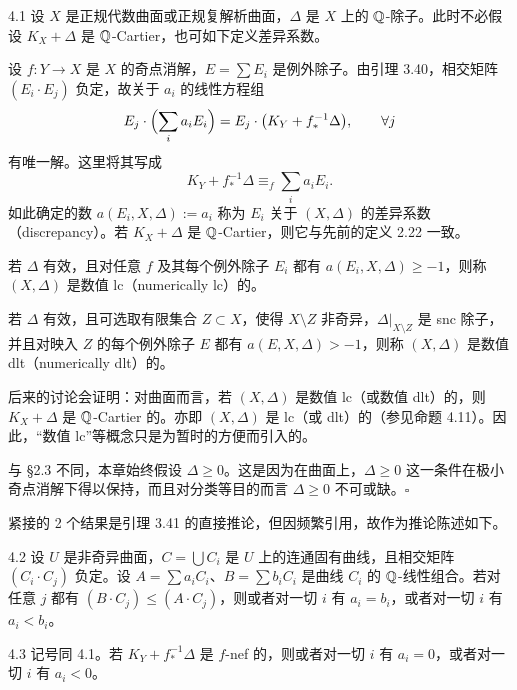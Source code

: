 \begin{notation}{4.1}
设 $X$ 是正规代数曲面或正规复解析曲面，$\Delta$ 是 $X$ 上的 $\mathbb{Q}$-除子。此时不必假设 $K_X+\Delta$ 是 $\mathbb{Q}$-Cartier，也可如下定义差异系数。

设 $f\colon Y\to X$ 是 $X$ 的奇点消解，$E=\sum E_i$ 是例外除子。由引理 3.40，相交矩阵 $(E_i\cdot E_j)$ 负定，故关于 $a_i$ 的线性方程组
\[
E_j\cdot\Bigl(\sum_i a_iE_i\Bigr)=E_j\cdot\bigl(K_Y+f_*^{-1}\Delta\bigr),\qquad \forall j
\]
有唯一解。这里将其写成
\[
K_Y+f_*^{-1}\Delta\equiv_f\sum_i a_iE_i .
\]
如此确定的数 $a(E_i,X,\Delta):=a_i$ 称为 $E_i$ 关于 $(X,\Delta)$ 的差异系数（discrepancy）。若 $K_X+\Delta$ 是 $\mathbb{Q}$-Cartier，则它与先前的定义 2.22 一致。

若 $\Delta$ 有效，且对任意 $f$ 及其每个例外除子 $E_i$ 都有 $a(E_i,X,\Delta)\ge -1$，则称 $(X,\Delta)$ 是数值 lc（numerically lc）的。

若 $\Delta$ 有效，且可选取有限集合 $Z\subset X$，使得 $X\setminus Z$ 非奇异，$\Delta|_{X\setminus Z}$
是 snc 除子，并且对映入 $Z$ 的每个例外除子 $E$ 都有 $a(E,X,\Delta)>-1$，则称 $(X,\Delta)$ 是数值 dlt（numerically dlt）的。

后来的讨论会证明：对曲面而言，若 $(X,\Delta)$ 是数值 lc（或数值 dlt）的，则 $K_X+\Delta$ 是 $\mathbb{Q}$-Cartier 的。亦即 $(X,\Delta)$ 是 lc（或 dlt）的（参见命题 4.11）。因此，“数值 lc”等概念只是为暂时的方便而引入的。

与 §2.3 不同，本章始终假设 $\Delta\ge 0$。这是因为在曲面上，$\Delta\ge 0$ 这一条件在极小奇点消解下得以保持，而且对分类等目的而言 $\Delta\ge 0$ 不可或缺。\hfill$\square$
\end{notation}


紧接的 2 个结果是引理 3.41 的直接推论，但因频繁引用，故作为推论陈述如下。

\begin{corollary}{4.2}
设 $U$ 是非奇异曲面，$C=\bigcup C_i$ 是 $U$ 上的连通固有曲线，且相交矩阵 $(C_i\cdot C_j)$ 负定。设 $A=\sum a_iC_i$、$B=\sum b_iC_i$ 是曲线 $C_i$ 的 $\mathbb{Q}$-线性组合。若对任意 $j$ 都有 $(B\cdot C_j)\le(A\cdot C_j)$，则或者对一切 $i$ 有 $a_i=b_i$，或者对一切 $i$ 有 $a_i<b_i$。
\end{corollary}

\begin{corollary}{4.3}
记号同 4.1。若 $K_Y+f_*^{-1}\Delta$ 是 $f$-nef 的，则或者对一切 $i$ 有 $a_i=0$，或者对一切 $i$ 有 $a_i<0$。
\end{corollary}

